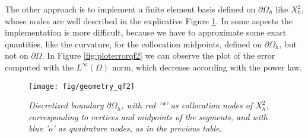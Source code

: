 \documentclass[10pt, a4paper]{article} %
\numberwithin{equation}{section}
\theoremstyle{definition}
\theoremstyle{plain}
\theoremstyle{plain}
\theoremstyle{plain}
\theoremstyle{plain}
\theoremstyle{plain}
\theoremstyle{plain}
\theoremstyle{plain}
\theoremstyle{plain}
\begin{document}
\par
The other approach is to implement a finite element basis defined on $\partial\Omega_h$ like $X^2_h$,
whose nodes are well described in the explicative Figure \ref{fig:qf2}.
In some aspects the implementation is more difficult, because we have to approximate
some exact quantities, like the curvature, for the collocation midpoints, defined on $\partial\Omega_h$, 
but not on $\partial\Omega$.
In Figure \ref{fig:ploterrorqf2} we can observe the plot of the error computed
with the $L^\infty(\Omega)$ norm, which decrease according with the power law.
\begin{center}
\begin{figure}
\centering
{
\texttt{[image: fig/geometry\_qf2]}
}
\caption{\emph{Discretized boundary $\partial\Omega_h$, with red '*' as collocation nodes of $X^2_h$, 
corresponding to vertices and midpoints of the segments, and with blue 'o' as quadrature nodes, as in the 
previous table}.}
\label{fig:qf2}
\end{figure}
\end{center}
\end{document}

